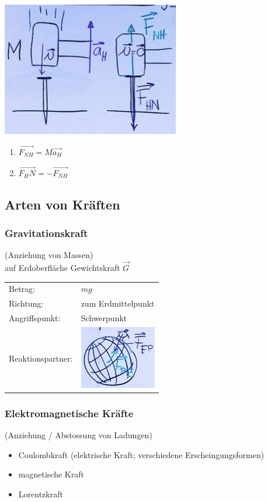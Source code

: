 \begin{bsp*}[ note = Hammer \& Nagel ]
	\includegraphics{Bild22}
	\begin{enumerate}[start = 2]
		\item $\vec{F_{NH}} = M \vec{a_H}$
		\item $\vec{F_HN} = -\vec{F_{NH}}$
	\end{enumerate}
\end{bsp*}

\subsection{Arten von Kräften}
\subsubsection{Gravitationskraft}
(Anziehung von Massen) \\
auf Erdoberfläche Gewichtskraft $\vec{G}$ \\
\begin{tabular}{ll}
	Betrag:			&$mg$ \\
	Richtung:			&zum Erdmittelpunkt \\
	Angriffspunkt:	&Schwerpunkt \\
	Reaktionspartner:	&\includegraphics{Bild23}
\end{tabular}

\subsubsection{Elektromagnetische Kräfte}
(Anziehung / Abstossung von Ladungen)
\begin{itemize}[ label = $\rightarrow$ ]
	\item Coulombkraft (elektrische Kraft; verschiedene Erscheingungsformen)
	\item magnetische Kraft
	\item Lorentzkraft
\end{itemize}

